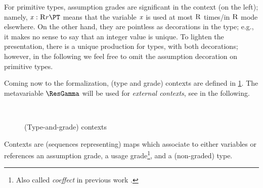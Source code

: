 For primitive types, assumption grades are significant in the context (on the left); namely, $\CtxElem{\x}{\Rgr}{\rgr}{\PT}$ means that the variable $\mathit{x}$ is used at most $\textsc{R}$ times/in $\textsc{R}$ mode elsewhere. On the other hand, they are pointless as decorations in the type; e.g., it makes no sense to say that an integer value is unique. 
To lighten the presentation, there is a unique production for types, with both decorations; however, in the following we feel free to omit the assumption decoration on primitive types.

Coming now to the formalization, (type and grade) contexts are defined in \cref{fig:ctx}.  The metavariable $\ResGamma$ will be used for \emph{external contexts}, see in the following.

\begin{figure}[ht]
\begin{grammatica} 
\\[1ex]
\end{grammatica}
\caption{(Type-and-grade) contexts}
\label{fig:ctx}
\end{figure}

Contexts are (sequences representing) maps which associate to either variables or references an assumption grade, a usage grade\footnote{Also called \emph{coeffect} in previous work \cite{PetricekOM13,PetricekOM14,BrunelGMZ14}.}, and a (non-graded) type.  


